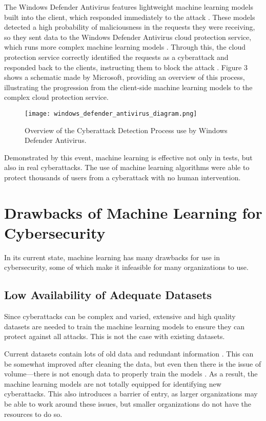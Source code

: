 The Windows Defender Antivirus features lightweight machine learning models built into the client, which responded immediately to the attack \cite{microsoft2018}.
These models detected a high probability of maliciousness in the requests they were receiving, so they sent data to the Windows Defender Antivirus cloud protection service, which runs more complex machine learning models \cite{microsoft2018}.
Through this, the cloud protection service correctly identified the requests as a cyberattack and responded back to the clients, instructing them to block the attack \cite{microsoft2018}.
Figure 3 shows a schematic made by Microsoft, providing an overview of this process, illustrating the progression from the client-side machine learning models to the complex cloud protection service.

\begin{figure}[H]
    \centering
    \texttt{[image: windows\_defender\_antivirus\_diagram.png]}
    \caption[Windows Defender Antivirus Workflow]{Overview of the Cyberattack Detection Process use by Windows Defender Antivirus. \cite{microsoft2018}}
\end{figure}

Demonstrated by this event, machine learning is effective not only in tests, but also in real cyberattacks.
The use of machine learning algorithms were able to protect thousands of users from a cyberattack with no human intervention.

\section{Drawbacks of Machine Learning for Cybersecurity}
In its current state, machine learning has many drawbacks for use in cybersecurity, some of which make it infeasible for many organizations to use.

\subsection{Low Availability of Adequate Datasets}
Since cyberattacks can be complex and varied, extensive and high quality datasets are needed to train the machine learning models to ensure they can protect against all attacks.
This is not the case with existing datasets.

Current datasets contain lots of old data and redundant information \cite{xin2018}.
This can be somewhat improved after cleaning the data, but even then there is the issue of volume---there is not enough data to properly train the models \cite{xin2018}.
As a result, the machine learning models are not totally equipped for identifying new cyberattacks.
This also introduces a barrier of entry, as larger organizations may be able to work around these issues, but smaller organizations do not have the resources to do so.

